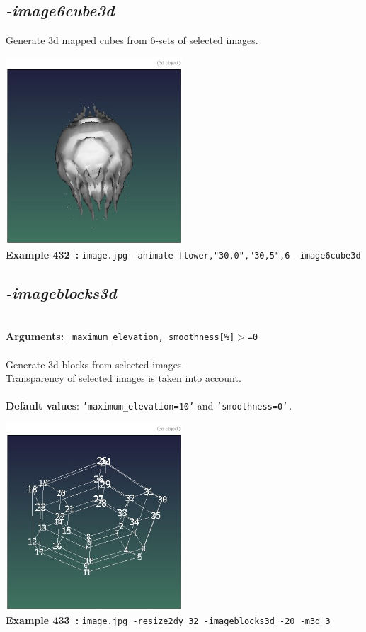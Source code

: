 \documentclass[a4paper,11pt,twoside]{book}
\begin{document}
\subsection{\emph{-image6cube3d} }\vspace*{-0.5em}
Generate 3d mapped cubes from 6-sets of selected images.
\begin{center}\includegraphics[keepaspectratio=true,height=7cm,width=\textwidth]{img/gmic_def432.jpg}\\
{\footnotesize \textbf{Example 432~:} \texttt{image.jpg -animate flower,"30,0","30,5",6 -image6cube3d}}
\end{center}

\subsection{\emph{-imageblocks3d} }\vspace*{-0.5em}
~\\\textbf{Arguments: } 
{\small \texttt{\_maximum\_elevation,\_smoothness[\%]$>$=0}}\\~\\
Generate 3d blocks from selected images.
~\\Transparency of selected images is taken into account.
~\\~\\\textbf{Default values}: {\small \texttt{'maximum\_elevation=10'} and \texttt{'smoothness=0'.}}
\begin{center}\includegraphics[keepaspectratio=true,height=7cm,width=\textwidth]{img/gmic_def433.jpg}\\
{\footnotesize \textbf{Example 433~:} \texttt{image.jpg -resize2dy 32 -imageblocks3d -20 -m3d 3}}
\end{center}
\end{document}
